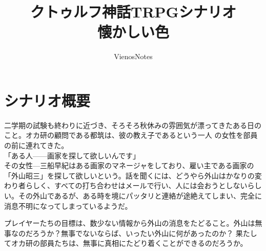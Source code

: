 \documentclass[a4paper,8pt,min]{jsarticle}
\title{{\large{クトゥルフ神話TRPGシナリオ}}\\ 懐かしい色}
\author{VienosNotes}
\begin{document}
\maketitle
\thispagestyle{empty}
\newpage
\setcounter{page}{1}
\section{シナリオ概要}
二学期の試験も終わりに近づき、そろそろ秋休みの雰囲気が漂ってきたある日の
こと。オカ研の顧問である都筑は、彼の教え子であるという一人
の女性を部員の前に連れてきた。\\


「ある人------画家を探して欲しいんです」\\


その女性---三船早紀はある画家のマネージャをしており、雇い主である画家の
「外山昭三」を探して欲しいという。話を聞くには、どうやら外山はかなりの変
わり者らしく、すべての打ち合わせはメールで行い、人には会おうとしないらし
い。その外山であるが、ある時を境にパッタリと連絡が途絶えてしまい、完全に
消息不明になってしまっているようだ。

プレイヤーたちの目標は、数少ない情報から外山の消息をたどること。外山は無
事なのだろうか？無事でないならば、いったい外山に何があったのか？
果たしてオカ研の部員たちは、無事に真相にたどり着くことができるのだろうか。








\end{document}

